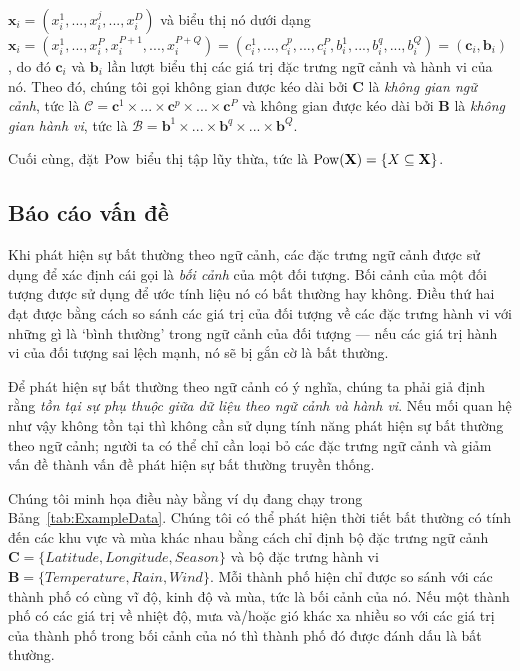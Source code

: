 $\mathbf{x}_{i}=(x_{i}^{1},...,x_{i}^{j},...,x_{i}^{D})$ và biểu thị nó dưới dạng $\mathbf{x}_{i}=(x_{i}^{1},...,x_{i}^{P},x_{i}^{P+1},...,x_{i}^{P+Q}) = (c_{i}^{1},...,c_{i}^{p},...,c_{i}^{P},b_{i}^{1},...,b_{i}^{q},...,b_{i}^{Q})=(\mathbf{c}_{i}, \mathbf{b}_{i}) $, do đó $\mathbf{c}_{i}$ và $\mathbf{b}_{i}$ lần lượt biểu thị các giá trị đặc trưng ngữ cảnh và hành vi của nó. Theo đó, chúng tôi gọi không gian được kéo dài bởi $\mathbf{C}$ là \textit{không gian ngữ cảnh}, tức là $\mathcal{C} = \mathbf{c}^{1}\times... \times\mathbf{c}^{p}\times...\times\mathbf{c}^{P}$ và không gian được kéo dài bởi $\mathbf{B}$ là \textit{không gian hành vi}, tức là $\mathcal{B} = \mathbf{b}^{1}\times...\times \mathbf{b}^{q}\times...\times\mathbf{b}^{Q}$.

Cuối cùng, đặt $\operatorname{Pow}$ biểu thị tập lũy thừa, tức là $\operatorname{Pow}(\mathbf{X}) = \{X \subseteq \mathbf{X}\}$.

\subsection{Báo cáo vấn đề}

Khi phát hiện sự bất thường theo ngữ cảnh, các đặc trưng ngữ cảnh được sử dụng để xác định cái gọi là \emph{bối cảnh} của một đối tượng. Bối cảnh của một đối tượng được sử dụng để ước tính liệu nó có bất thường hay không. Điều thứ hai đạt được bằng cách so sánh các giá trị của đối tượng về các đặc trưng hành vi với những gì là `bình thường' trong ngữ cảnh của đối tượng --- nếu các giá trị hành vi của đối tượng sai lệch mạnh, nó sẽ bị gắn cờ là bất thường.

Để phát hiện sự bất thường theo ngữ cảnh có ý nghĩa, chúng ta phải giả định rằng \emph {tồn tại sự phụ thuộc giữa dữ liệu theo ngữ cảnh và hành vi}. Nếu mối quan hệ như vậy không tồn tại thì không cần sử dụng tính năng phát hiện sự bất thường theo ngữ cảnh; người ta có thể chỉ cần loại bỏ các đặc trưng ngữ cảnh và giảm vấn đề thành vấn đề phát hiện sự bất thường truyền thống.

Chúng tôi minh họa điều này bằng ví dụ đang chạy trong Bảng~\ref{tab:ExampleData}. Chúng tôi có thể phát hiện thời tiết bất thường có tính đến các khu vực và mùa khác nhau bằng cách chỉ định bộ đặc trưng ngữ cảnh $\mathbf{C} = \{Latitude, Longitude, Season\}$ và bộ đặc trưng hành vi $\mathbf{B} = \{Temperature, Rain, Wind\}$. Mỗi thành phố hiện chỉ được so sánh với các thành phố có cùng vĩ độ, kinh độ và mùa, tức là bối cảnh của nó. Nếu một thành phố có các giá trị về nhiệt độ, mưa và/hoặc gió khác xa nhiều so với các giá trị của thành phố trong bối cảnh của nó thì thành phố đó được đánh dấu là bất thường.

